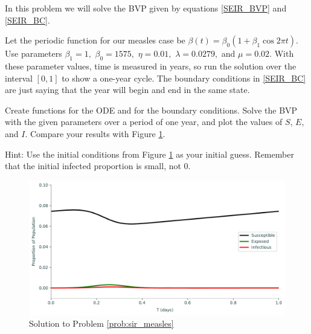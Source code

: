 \begin{problem}
In this problem we will solve the BVP given by equations \eqref{SEIR_BVP} and \eqref{SEIR_BC}.

Let the periodic function for our measles case be $\beta(t) = \beta_0(1 + \beta_1 \cos{2\pi t})$.
Use parameters $\beta_1 = 1,$ $\beta_0 = 1575,$ $\eta = 0.01,$ $\lambda = 0.0279,$ and $\mu = 0.02.$
With these parameter values, time is measured in years, so run the solution over the interval $\left[0, 1\right]$ to show a one-year cycle.
The boundary conditions in \eqref{SEIR_BC} are just saying that the year will begin and end in the same state.

Create functions for the ODE and for the boundary conditions.
Solve the BVP with the given parameters over a period of one year, and plot the values of $S$, $E$, and $I$.
Compare your results with Figure \ref{fig:sir4}.

Hint: Use the initial conditions from Figure \ref{fig:sir4} as your initial guess. 
Remember that the initial infected proportion is small, not 0.

\label{prob:sir_measles}
\end{problem}

\begin{figure}[H]
    \centering
    \includegraphics[width=\textwidth]{figures/measles.pdf}
    \caption{Solution to Problem \ref{prob:sir_measles}}
    \label{fig:sir4}
\end{figure}

